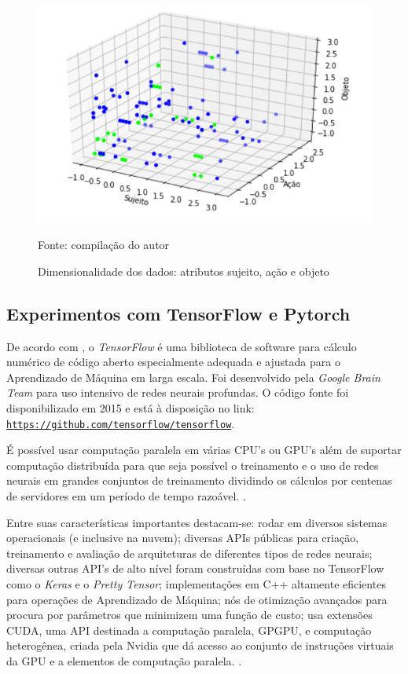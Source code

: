 \begin{figure}[h!]
	\centering
	\includegraphics[width=.6\textwidth]{imagens/dimensionalidade.png}
	\caption{Dimensionalidade dos dados: atributos sujeito, ação e objeto}
	\label{fig:dimensionalidade}
	{\scriptsize Fonte: compilação do autor}
\end{figure}

\subsection{Experimentos com TensorFlow e Pytorch}
De acordo com \cite[p. 233]{geron_maos_2020}, o \textit{TensorFlow} é uma biblioteca de software para cálculo numérico de código aberto especialmente adequada e ajustada para o Aprendizado de Máquina em larga escala. Foi desenvolvido pela \textit{Google Brain Team} para uso intensivo de redes neurais profundas. O código fonte foi disponibilizado em 2015 e está à disposição no link: \underline{\texttt{https://github.com/tensorflow/tensorflow}}.

É possível usar computação paralela em várias CPU's ou GPU's além de suportar computação distribuída para que seja possível o treinamento e o uso de redes neurais em grandes conjuntos de treinamento dividindo os cálculos por centenas de servidores em um período de tempo razoável. \cite{geron_maos_2020}. 

Entre suas características importantes destacam-se: rodar em diversos sistemas operacionais (e inclusive na nuvem); diversas APIs públicas para criação, treinamento e avaliação de arquiteturas de diferentes tipos de redes neurais; diversas outras API's de alto nível foram construídas com base no TensorFlow como o \textit{Keras} e o \textit{Pretty Tensor}; implementações em C++ altamente eficientes para operações de Aprendizado de Máquina; nós de otimização avançados para procura por parâmetros que minimizem uma função de custo; usa extensões CUDA, uma  API destinada a computação paralela, GPGPU, e computação heterogênea, criada pela Nvidia que dá acesso ao conjunto de instruções virtuais da GPU e a elementos de computação paralela. \cite{geron_maos_2020}.

